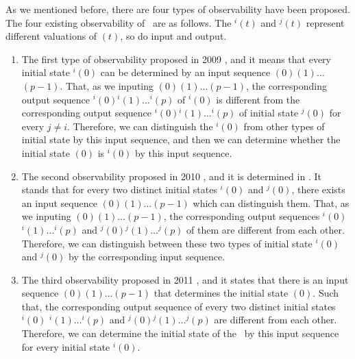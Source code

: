 As we mentioned before, there are four types of observability have been proposed. The four existing observability of \BCNs\ are as follows. The \State$^{i}(t)$ and \State$^{j}(t)$ represent different valuations of \State$(t)$, so do input and output. 
\begin{enumerate}
	\item The first type of observability proposed in 2009 \cite{cheng2009controllability}, and it means that every initial state \State$^{i}(0)$ can be determined by an input sequence \Input$(0)$\Input$(1)\ldots$\Input$(p-1)$. That, as we inputing \Input$(0)$\Input$(1)\ldots$\Input$(p-1)$, the corresponding output sequence \Output$^{i}(0)$\Output$^{i}(1)\ldots$\Output$^{i}(p)$ of \State$^{i}(0)$ is different from the corresponding output sequence \Output$^{i}(0)$\Output$^{i}(1)\ldots$\Output$^{i}(p)$ of initial state \State$^{j}(0)$ for every $j\ne i$. Therefore, we can distinguish the \State$^{i}(0)$ from other types of initial state by this input sequence, and then we can determine whether the initial state \State$(0)$ is \State$^{i}(0)$ by this input sequence.
	\item 
	The second observability proposed in 2010 \cite{Zhao2010Input}, and it is determined in \cite{Li2015Controllability}. It stands that for every two distinct initial states \State$^{i}(0)$ and \State$^{j}(0)$, there exists an input sequence \Input$(0)$\Input$(1)\ldots$\Input$(p-1)$ which can distinguish them. That, as we inputing \Input$(0)$\Input$(1)\ldots$\Input$(p-1)$, the corresponding output sequences \Output$^{i}(0)$\Output$^{i}(1)\ldots$\Output$^{i}(p)$ and \Output$^{j}(0)$\Output$^{j}(1)\ldots$\Output$^{j}(p)$ of them are different from each other. Therefore, we can distinguish between these two types of initial state \State$^{i}(0)$ and \State$^{j}(0)$ by the corresponding input sequence.	
	\item The third observability proposed in 2011 \cite{Cheng2011Identification}, and it states that there is an input sequence \Input$(0)$\Input$(1)\ldots$\Input$(p-1)$ that determines the initial state \State$(0)$. Such that, the corresponding output sequence of every two distinct initial states \Output$^{i}(0)$ \Output$^{i}(1)\ldots$\Output$^{i}(p)$ and \Output$^{j}(0)$\Output$^{j}(1)\ldots$\Output$^{j}(p)$ are different from each other. Therefore, we can determine the initial state of the \BCN\ by this input sequence for every initial state \State$^{i}(0)$.
	

\end{enumerate}

